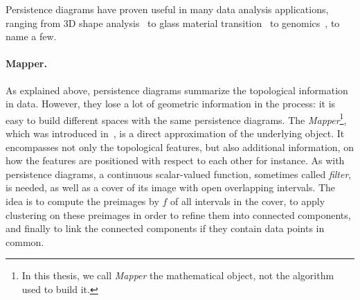 Persistence diagrams have proven
useful %
in many data analysis applications, ranging from 3D shape analysis~\cite{Carriere15a, Chazal09c} 
to glass material transition~\cite{Gameiro16, Hiraoka16} to genomics~\cite{Camara16,Chan13}, to name a few. 
  
   


 


\paragraph*{Mapper.} As explained above, persistence diagrams summarize the topological information in data.
However, they lose a lot of geometric information in the process: it is easy to build different spaces with the same persistence diagrams.
The {\em Mapper}\footnote{In this thesis, we call {\em Mapper} the
mathematical object, not the algorithm used to build it.}, 
which was introduced in~\cite{Singh07}, is a direct approximation of the underlying object. It encompasses not only the topological features,
but also additional information, on how the features are positioned with respect to each other for instance.
As with persistence diagrams, a continuous scalar-valued function, sometimes called {\em filter}, is needed, as well as a cover of 
its image with open overlapping intervals.
The idea is to compute the preimages by $f$ of all intervals in the cover, to apply clustering on these preimages in order to refine them into connected components,
and finally to link the connected components if they contain data points in common.  

